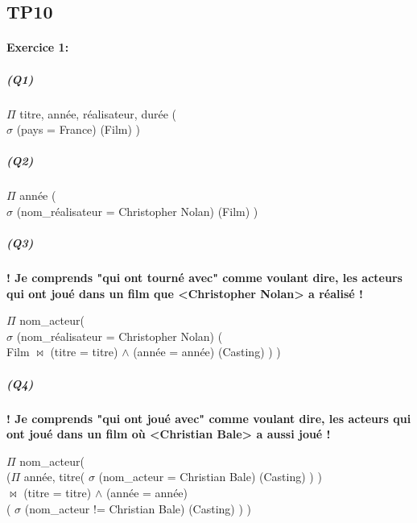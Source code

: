 \documentclass[12pt]
{report}
\newcommand\tab[1][1cm]{\hspace*{#1}}
\begin{document}
\pagestyle{fancy}

\begin{center}
	\section*{\textbf{TP10}}
\end{center}
\bigskip

\paragraph*{\textbf{Exercice 1:}}

\subparagraph*{\textbf{(Q1)}}
\begin{center}
$\Pi$ {\scriptsize titre, année, réalisateur, durée} ( \tab\tab\tab\tab\tab\tab\tab\tab
\\$\sigma$ {\scriptsize (pays = France)} (Film) )
\end{center}

\subparagraph*{\textbf{(Q2)}}
\begin{center}
$\Pi$ {\scriptsize année} ( \tab\tab\tab\tab\tab\tab\tab\tab
\\$\sigma$ {\scriptsize (nom\_réalisateur = Christopher Nolan)} (Film) )
\end{center}

\subparagraph*{\textbf{(Q3)}} \textbf{! Je comprends "qui ont tourné avec" comme voulant dire, les acteurs qui ont joué dans un film que <Christopher Nolan> a réalisé !}
\begin{center}
$\Pi$ {\scriptsize nom\_acteur}(\tab\tab\tab\tab\tab\tab\tab\tab\tab\tab\tab\tab 
\\$\sigma$ {\scriptsize (nom\_réalisateur = Christopher Nolan)} ( \tab\tab\tab\tab\tab\tab\tab
\\ \tab Film $\bowtie$  {\scriptsize (titre = titre) $\wedge$ (année = année)} (Casting) ) )
\end{center}

\subparagraph*{\textbf{(Q4)}} \textbf{! Je comprends "qui ont joué avec" comme voulant dire, les acteurs qui ont joué dans un film où <Christian Bale> a aussi joué !}

\begin{center}
$\Pi$ {\scriptsize nom\_acteur}(\tab\tab\tab\tab\tab\tab\tab\tab\tab\tab\tab
\\($\Pi$ {\scriptsize année, titre}( $\sigma$ {\scriptsize (nom\_acteur = Christian Bale)} (Casting) ) )
\\ \tab\tab $\bowtie$  {\scriptsize (titre = titre) $\wedge$ (année = année)} 
\\ \tab\tab ( $\sigma$ {\scriptsize (nom\_acteur != Christian Bale)} (Casting) ) )
\end{center}
\end{document}
